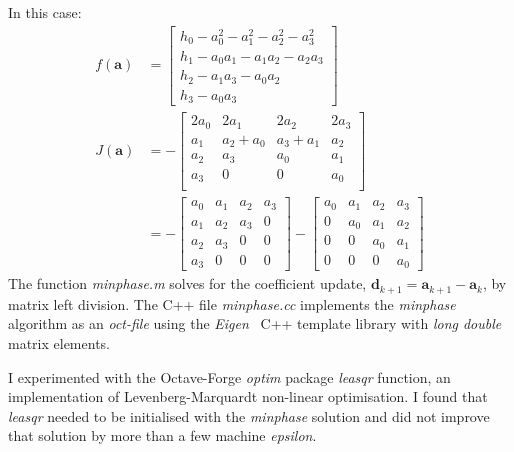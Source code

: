 \documentclass[a4paper,twoside,10pt,english]{report}
\begin{document}
In this case:
\begin{align*}
  f\left(\boldsymbol{a}\right)
  &= \left[ \begin{array}{l}
              h_{0} - a_{0}^{2}  - a_{1}^{2}   - a_{2}^{2}  - a_{3}^{2} \\
              h_{1} - a_{0}a_{1} - a_{1}a_{2}  - a_{2}a_{3} \\
              h_{2} - a_{1}a_{3} - a_{0}a_{2} \\
              h_{3} - a_{0}a_{3}
            \end{array} \right] \\
  J\left(\boldsymbol{a}\right)
  &= -\left[ \begin{array}{cccc}
               2a_{0} & 2a_{1} & 2a_{2} & 2a_{3} \\
               a_{1} & a_{2}+a_{0} & a_{3}+a_{1} & a_{2} \\
               a_{2} & a_{3} & a_{0} & a_{1} \\
               a_{3} & 0 & 0 & a_{0} \\
            \end{array} \right] \\
  &= - \left[ \begin{array}{cccc}
                a_{0} & a_{1} & a_{2} & a_{3} \\
                a_{1} & a_{2} & a_{3} & 0 \\
                a_{2} & a_{3} & 0     & 0 \\
                a_{3} & 0     & 0     & 0
            \end{array} \right]                               
  - \left[ \begin{array}{cccc}
             a_{0} & a_{1} & a_{2} & a_{3} \\
             0     & a_{0} & a_{1} &  a_{2} \\
             0     & 0     & a_{0} & a_{1} \\
             0     & 0     & 0    & a_{0}
            \end{array} \right]                      
\end{align*}
The function \emph{minphase.m} solves for the coefficient update,
$\boldsymbol{d}_{k+1}=\boldsymbol{a}_{k+1}-\boldsymbol{a}_{k}$, by matrix
left division. The C++ file \emph{minphase.cc} implements the \emph{minphase}
algorithm as an \emph{oct-file} using the \emph{Eigen}~\cite{EigenWeb} C++
template library with \emph{long double} matrix elements.

I experimented with the Octave-Forge \emph{optim} package \emph{leasqr}
function, an implementation of Levenberg-Marquardt non-linear optimisation.
I found that \emph{leasqr} needed to be initialised with the \emph{minphase}
solution and did not improve that solution by more than a few machine
\emph{epsilon}.
\end{document}
